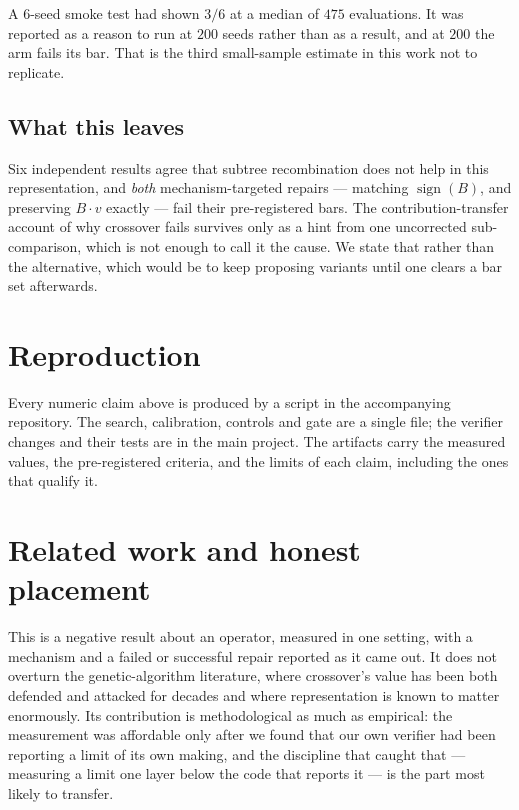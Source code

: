 \documentclass[11pt,a4paper]{article}
\theoremstyle{definition}
\theoremstyle{remark}
\begin{document}
A $6$-seed smoke test had shown $3/6$ at a median of $475$ evaluations. It was
reported as a reason to run at $200$ seeds rather than as a result, and at $200$
the arm fails its bar. That is the third small-sample estimate in this work not
to replicate.

\subsection{What this leaves}

Six independent results agree that subtree recombination does not help in this
representation, and \emph{both} mechanism-targeted repairs --- matching
$\operatorname{sign}(B)$, and preserving $B\cdot v$ exactly --- fail their
pre-registered bars. The contribution-transfer account of why crossover fails
survives only as a hint from one uncorrected sub-comparison, which is not enough
to call it the cause. We state that rather than the alternative, which would be
to keep proposing variants until one clears a bar set afterwards.

\section{Reproduction}

Every numeric claim above is produced by a script in the accompanying
repository. The search, calibration, controls and gate are a single file; the
verifier changes and their tests are in the main project. The artifacts carry
the measured values, the pre-registered criteria, and the limits of each claim,
including the ones that qualify it.

\section{Related work and honest placement}

This is a negative result about an operator, measured in one setting, with a
mechanism and a failed or successful repair reported as it came out. It does not
overturn the genetic-algorithm literature, where crossover's value has been both
defended and attacked for decades and where representation is known to matter
enormously. Its contribution is methodological as much as empirical: the
measurement was affordable only after we found that our own verifier had been
reporting a limit of its own making, and the discipline that caught that ---
measuring a limit one layer below the code that reports it --- is the part most
likely to transfer.
\end{document}
